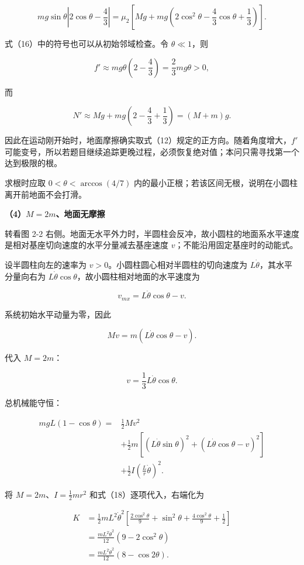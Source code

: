 \documentclass[12pt,a4paper,UTF8]{ctexart}
\begin{document}
\[\boxed{
mg\sin\theta\left|2\cos\theta-\frac43\right|
=\mu_2\left[Mg+mg\left(2\cos^2\theta-\frac43\cos\theta+\frac13\right)\right]
}. \tag{16}\]

式（16）中的符号也可以从初始邻域检查。令 \(\theta\ll1\)，则

\[f'\approx mg\theta\left(2-\frac43\right)
=\frac23mg\theta>0,\]

而

\[N'\approx Mg+mg\left(2-\frac43+\frac13\right)
=(M+m)g.\]

因此在运动刚开始时，地面摩擦确实取式（12）规定的正方向。随着角度增大，\(f'\)
可能变号，所以若题目继续追踪更晚过程，必须恢复绝对值；本问只需寻找第一个达到极限的根。

求根时应取 \(0<\theta<\arccos(4/7)\)
内的最小正根；若该区间无根，说明在小圆柱离开前地面不会打滑。

\textbf{（4）\(M=2m\)、地面无摩擦}

转看图 2-2
右侧。地面无水平外力时，半圆柱会反冲，故小圆柱的地面系水平速度是相对基座切向速度的水平分量减去基座速度
\(v\)；不能沿用固定基座时的动能式。

设半圆柱向左的速率为 \(v>0\)。小圆柱圆心相对半圆柱的切向速度为
\(L\dot\theta\)，其水平分量向右为
\(L\dot\theta\cos\theta\)，故小圆柱相对地面的水平速度为

\[v_{mx}=L\dot\theta\cos\theta-v.\]

系统初始水平动量为零，因此

\[Mv=m(L\dot\theta\cos\theta-v). \tag{17}\]

代入 \(M=2m\)：

\[\boxed{v=\frac13L\dot\theta\cos\theta}. \tag{18}\]

总机械能守恒：

\[\begin{aligned}
mgL(1-\cos\theta)
={}&\frac12Mv^2\\
&+\frac12m\left[(L\dot\theta\sin\theta)^2
+(L\dot\theta\cos\theta-v)^2\right]\\
&+\frac12I\left(\frac{L}{r}\dot\theta\right)^2.
\end{aligned} \tag{19}\]

将 \(M=2m\)、\(I=\frac12mr^2\) 和式（18）逐项代入，右端化为

\[\begin{aligned}
K
&=\frac12mL^2\dot\theta^2
\left[\frac{2\cos^2\theta}{9}
+\sin^2\theta+\frac{4\cos^2\theta}{9}+\frac12\right]\\
&=\frac{mL^2\dot\theta^2}{12}(9-2\cos^2\theta)\\
&=\frac{mL^2\dot\theta^2}{12}(8-\cos2\theta).
\end{aligned}\]
\end{document}
